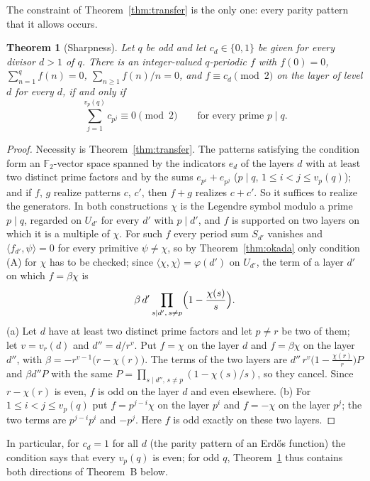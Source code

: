 \documentclass[11pt]{amsart}
\newtheorem{theorem}{Theorem}[section]
\theoremstyle{definition}
\theoremstyle{remark}
\newcommand{\F}{\mathbb F}
\newcommand{\ip}[2]{\langle #1,#2\rangle}
\numberwithin{equation}{section}
\begin{document}
The constraint of Theorem~\ref{thm:transfer} is the only one: every parity pattern that it allows occurs.

\begin{theorem}[Sharpness]\label{thm:sharp}
Let $q$ be odd and let $c_d\in\{0,1\}$ be given for every divisor $d>1$ of $q$.
There is an integer-valued $q$-periodic $f$ with $f(0)=0$, $\sum_{n=1}^qf(n)=0$, $\sum_{n\ge1}f(n)/n=0$, and $f\equiv c_d\pmod 2$ on the layer of level $d$ for every $d$, if and only if
\[
\sum_{j=1}^{v_p(q)}c_{p^j}\equiv0\pmod 2\qquad\text{for every prime }p\mid q .
\]
\end{theorem}

\begin{proof}
Necessity is Theorem~\ref{thm:transfer}.
The patterns satisfying the condition form an $\F_2$-vector space spanned by the indicators $e_d$ of the layers $d$ with at least two distinct prime factors and by the sums $e_{p^i}+e_{p^j}$ ($p\mid q$, $1\le i<j\le v_p(q)$); and if $f$, $g$ realize patterns $c$, $c'$, then $f+g$ realizes $c+c'$.
So it suffices to realize the generators.
In both constructions $\chi$ is the Legendre symbol modulo a prime $p\mid q$, regarded on $U_{d'}$ for every $d'$ with $p\mid d'$, and $f$ is supported on two layers on which it is a multiple of $\chi$.
For such $f$ every period sum $S_{d'}$ vanishes and $\ip{f_{d'}}{\psi}=0$ for every primitive $\psi\neq\chi$, so by Theorem~\ref{thm:okada} only condition (A) for $\chi$ has to be checked; since $\ip{\chi}{\chi}=\varphi(d')$ on $U_{d'}$, the term of a layer $d'$ on which $f=\beta\chi$ is
\[
\beta\,d'\prod_{s\mid d',\,s\neq p}\Bigl(1-\frac{\chi(s)}{s}\Bigr).
\]
(a) Let $d$ have at least two distinct prime factors and let $p\neq r$ be two of them; let $v=v_r(d)$ and $d''=d/r^{v}$.
Put $f=\chi$ on the layer $d$ and $f=\beta\chi$ on the layer $d''$, with $\beta=-r^{v-1}\bigl(r-\chi(r)\bigr)$.
The terms of the two layers are $d''\,r^{v}\bigl(1-\frac{\chi(r)}r\bigr)P$ and $\beta d''P$ with the same $P=\prod_{s\mid d'',\,s\neq p}(1-\chi(s)/s)$, so they cancel.
Since $r-\chi(r)$ is even, $f$ is odd on the layer $d$ and even elsewhere.
(b) For $1\le i<j\le v_p(q)$ put $f=p^{j-i}\chi$ on the layer $p^i$ and $f=-\chi$ on the layer $p^j$; the two terms are $p^{j-i}p^{i}$ and $-p^{j}$.
Here $f$ is odd exactly on these two layers.
\end{proof}

In particular, for $c_d=1$ for all $d$ (the parity pattern of an Erd\H{o}s function) the condition says that every $v_p(q)$ is even; for odd $q$, Theorem~\ref{thm:sharp} thus contains both directions of Theorem~B below.
\end{document}
